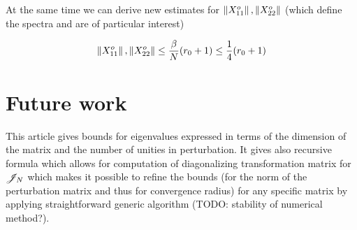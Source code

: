 \documentclass{article}
\begin{document}
At the same time we can derive new estimates for
\( \left\|{X_{11}^o}\right\|, \left\|{X_{22}^o}\right\| \)
(which define the spectra and are of particular interest)

\[ \left\|{X_{11}^o}\right\|, \left\|{X_{22}^o}\right\|
   \leq \frac{\beta}{N}(r_0 + 1)
   \leq \frac14 (r_0 + 1)\]




\section{Future work}
This article gives bounds for eigenvalues expressed in terms of the dimension of the matrix and the number of unities in perturbation.
It gives also recursive formula which allows for computation of diagonalizing transformation matrix for \( \mathscr{J}_{N} \)
which makes it possible to refine the bounds (for the norm of the perturbation matrix and thus for convergence radius)
for any specific matrix by applying straightforward generic algorithm (TODO: stability of numerical method?).
\end{document}
